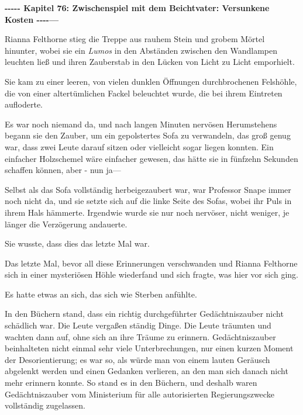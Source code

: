 

\hypertarget{zwischenspiel-mit-dem-beichtvater-versunkene-kosten}{%

\textbf{-\/-\/-\/-\/- Kapitel 76: Zwischenspiel mit dem Beichtvater: Versunkene Kosten -\/-\/-\/-\/—}

Rianna Felthorne stieg die Treppe aus rauhem Stein und grobem Mörtel hinunter, wobei sie ein \emph{Lumos} in den Abständen zwischen den Wandlampen leuchten ließ und ihren Zauberstab in den Lücken von Licht zu Licht emporhielt.

Sie kam zu einer leeren, von vielen dunklen Öffnungen durchbrochenen Felshöhle, die von einer altertümlichen Fackel beleuchtet wurde, die bei ihrem Eintreten aufloderte.

Es war noch niemand da, und nach langen Minuten nervösen Herumstehens begann sie den Zauber, um ein gepolstertes Sofa zu verwandeln, das groß genug war, dass zwei Leute darauf sitzen oder vielleicht sogar liegen konnten. Ein einfacher Holzschemel wäre einfacher gewesen, das hätte sie in fünfzehn Sekunden schaffen können, aber - nun ja—

Selbst als das Sofa vollständig herbeigezaubert war, war Professor Snape immer noch nicht da, und sie setzte sich auf die linke Seite des Sofas, wobei ihr Puls in ihrem Hals hämmerte. Irgendwie wurde sie nur noch nervöser, nicht weniger, je länger die Verzögerung andauerte.

Sie wusste, dass dies das letzte Mal war.

Das letzte Mal, bevor all diese Erinnerungen verschwanden und Rianna Felthorne sich in einer mysteriösen Höhle wiederfand und sich fragte, was hier vor sich ging.

Es hatte etwas an sich, das sich wie Sterben anfühlte.

In den Büchern stand, dass ein richtig durchgeführter Gedächtniszauber nicht schädlich war. Die Leute vergaßen ständig Dinge. Die Leute träumten und wachten dann auf, ohne sich an ihre Träume zu erinnern. Gedächtniszauber beinhalteten nicht einmal sehr viele Unterbrechungen, nur einen kurzen Moment der Desorientierung; es war so, als würde man von einem lauten Geräusch abgelenkt werden und einen Gedanken verlieren, an den man sich danach nicht mehr erinnern konnte. So stand es in den Büchern, und deshalb waren Gedächtniszauber vom Ministerium für alle autorisierten Regierungszwecke vollständig zugelassen.

}
